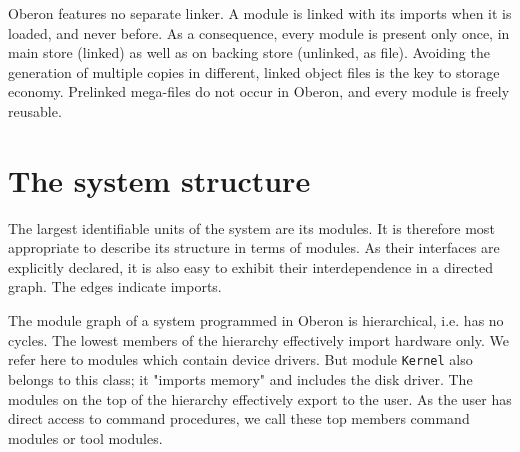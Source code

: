 Oberon features no separate linker. A module is linked with its imports when it is loaded,
and never before. As a consequence, every module is present only once, in main store
(linked) as well as on backing store (unlinked, as file). Avoiding the generation
of multiple copies in different, linked object files is the key to storage economy.
Prelinked mega-files do not occur in Oberon, and every module is freely reusable.

\section{The system structure}
The largest identifiable units of the system are its modules. It is therefore most appropriate
to describe its structure in terms of modules. As their interfaces are explicitly declared, it
is also easy to exhibit their interdependence in a directed graph. The edges indicate imports.

The module graph of a system programmed in Oberon is hierarchical, i.e. has no cycles. The
lowest members of the hierarchy effectively import hardware only. We refer here to modules
which contain device drivers. But module \verb|Kernel| also belongs to this class; it
"imports memory" and includes the disk driver. The modules on the top of the hierarchy
effectively export to the user. As the user has direct access to command procedures, we
call these top members command modules or tool modules.

